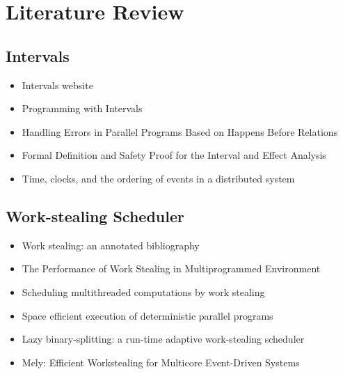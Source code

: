 
\chapter{Literature Review}
\label{cha:literature-review}

\section{Intervals}
\label{sec:lr-intervals}

\begin{itemize}
\item Intervals website \cite{Matsakis2010}
\item Programming with Intervals \cite{Matsakis2009b}
\item Handling Errors in Parallel Programs Based on Happens Before
  Relations \cite{Matsakis2010a}
\item Formal Definition and Safety Proof for the Interval and Effect
  Analysis \cite{Matsakis2009}
\item Time, clocks, and the ordering of events in a distributed system
  \cite{Lamport1978}
\end{itemize}


\section{Work-stealing Scheduler}
\label{sec:lr-work-stealing-scheduler}

\begin{itemize}
\item Work stealing: an annotated bibliography \cite{Neill2001}
\item The Performance of Work Stealing in Multiprogrammed Environment
  \cite{Blumofe1998a}
\item Scheduling multithreaded computations by work stealing
  \cite{Blumofe1999}
\item Space efficient execution of deterministic parallel programs
  \cite{Simpson1999}
\item Lazy binary-splitting: a run-time adaptive work-stealing
  scheduler \cite{Tzannes2010}
\item Mely: Efficient Workstealing for Multicore Event-Driven Systems
  \cite{Gaud2010}
\end{itemize}


